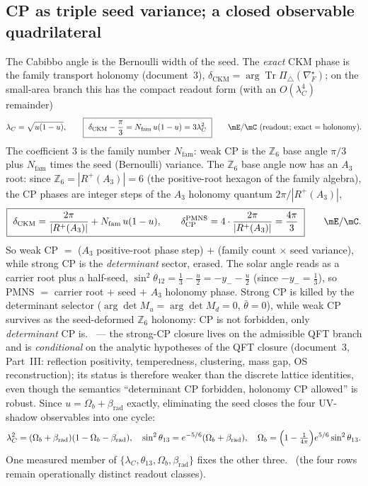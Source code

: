 \documentclass[11pt,a4paper]{article}
\newcommand{\Nfam}{N_{\mathrm{fam}}}
\newcommand{\useed}{u}
\newcommand{\betarad}{\beta_{\mathrm{rad}}}
\newcommand{\lC}{\lambda_C}
\theoremstyle{definition}
\begin{document}
\subsection{CP as triple seed variance; a closed observable quadrilateral}
The Cabibbo angle is the Bernoulli width of the seed. The \emph{exact} CKM phase is the family
transport holonomy (document~3), $\delta_{\mathrm{CKM}}=\arg\operatorname{Tr}\Pi_\triangle(\nabla_F^\star)$; on the
small-area branch this has the compact readout form (with an $O(\lC^4)$ remainder)
\begin{equation}
  \lC=\sqrt{\useed(1-\useed)},\qquad
  \boxed{\ \delta_{\mathrm{CKM}}-\frac{\pi}{3}=\Nfam\,\useed(1-\useed)=3\lC^2\ }\qquad\mE/\mC\ (\text{readout; exact}=\text{holonomy}) .
\end{equation}
The coefficient $3$ is the family number $\Nfam$: weak CP is the $\mathbb Z_6$ base angle $\pi/3$
plus $\Nfam$ times the seed (Bernoulli) variance. The $\mathbb Z_6$ base angle now has an $A_3$ root:
since $\mathbb Z_6=|R^+(A_3)|=6$ (the positive-root hexagon of the family algebra), the CP phases are
integer steps of the $A_3$ holonomy quantum $2\pi/|R^+(A_3)|$,
\begin{equation}
  \boxed{\ \delta_{\mathrm{CKM}}=\frac{2\pi}{|R^+(A_3)|}+\Nfam\,\useed(1-\useed),\qquad
  \delta^{\mathrm{PMNS}}_{\mathrm{CP}}=4\cdot\frac{2\pi}{|R^+(A_3)|}=\frac{4\pi}{3}\ }\qquad\mE/\mC .
\end{equation}
So weak CP $=$ ($A_3$ positive-root phase step) $+$ (family count $\times$ seed variance), while strong
CP is the \emph{determinant} sector, erased. The solar angle reads as a carrier root plus a half-seed,
$\sin^2\theta_{12}=\tfrac13-\tfrac{\useed}{2}=-y_- - \tfrac{\useed}{2}$ (since $-y_-=\tfrac13$), so
PMNS $=$ carrier root $+$ seed $+$ $A_3$ holonomy phase. \mC
Strong CP is killed by the determinant selector ($\arg\det M_u=\arg\det M_d=0$, $\bar\theta=0$),
while weak CP survives as the seed-deformed $\mathbb Z_6$ holonomy: CP is not forbidden, only
\emph{determinant} CP is. \mC\ --- the strong-CP closure lives on the admissible QFT branch and is
\emph{conditional} on the analytic hypotheses of the QFT closure (document~3, Part~III: reflection positivity, temperedness,
clustering, mass gap, OS reconstruction); its status is therefore weaker than the discrete lattice
identities, even though the semantics ``determinant CP forbidden, holonomy CP allowed'' is robust. Since $\useed=\Omega_b+\betarad$ exactly, eliminating the seed closes the
four UV-shadow observables into one cycle:
\begin{equation}
  \lC^2=(\Omega_b+\betarad)(1-\Omega_b-\betarad),\quad
  \sin^2\theta_{13}=e^{-5/6}(\Omega_b+\betarad),\quad
  \Omega_b=\Bigl(1-\tfrac{1}{4\pi}\Bigr)e^{5/6}\sin^2\theta_{13}. 
\end{equation}
One measured member of $\{\lC,\theta_{13},\Omega_b,\betarad\}$ fixes the other three. \mE\ (the four
rows remain operationally distinct readout classes).
\end{document}
